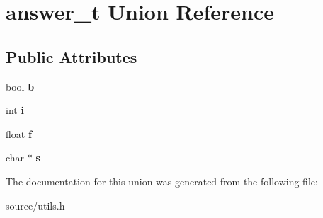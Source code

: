 \hypertarget{unionanswer__t}{}\section{answer\+\_\+t Union Reference}
\label{unionanswer__t}
\subsection*{Public Attributes}
\begin{DoxyCompactItemize}
\item 
bool {\bfseries b}\hypertarget{unionanswer__t_a4a21ae23e6a74faec3b5053671ce7c70}{}\label{unionanswer__t_a4a21ae23e6a74faec3b5053671ce7c70}

\item 
int {\bfseries i}\hypertarget{unionanswer__t_a21d3d2b485a0dcf04e6ec6a60bb4d4db}{}\label{unionanswer__t_a21d3d2b485a0dcf04e6ec6a60bb4d4db}

\item 
float {\bfseries f}\hypertarget{unionanswer__t_acc96d348401060d8beea19445f9fe184}{}\label{unionanswer__t_acc96d348401060d8beea19445f9fe184}

\item 
char $\ast$ {\bfseries s}\hypertarget{unionanswer__t_a0de66e8519f97035ac10688155603648}{}\label{unionanswer__t_a0de66e8519f97035ac10688155603648}

\end{DoxyCompactItemize}


The documentation for this union was generated from the following file\+:\begin{DoxyCompactItemize}
\item 
source/utils.\+h\end{DoxyCompactItemize}
